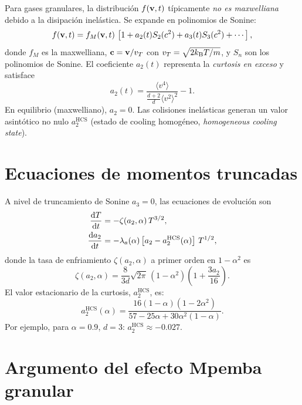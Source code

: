 Para gases granulares, la distribución $f(\vb{v},t)$ típicamente \emph{no es 
maxwelliana} debido a la disipación inelástica. Se expande en polinomios de 
Sonine:
\begin{equation}
    f(\vb{v},t) = f_{M}(\vb{v},t) \, \left[1 + a_{2}(t) S_{2}(c^{2}) + a_{3}(t) S_{3}(c^{2}) + \cdots\right],
\end{equation}
%
donde $f_{M}$ es la maxwelliana, $\vb{c} = \vb{v}/v_{T}$ con $v_{T} = \sqrt{2 k_{\mathrm{B}} T/m}$, 
y $S_{n}$ son los polinomios de Sonine. El coeficiente $a_{2}(t)$ representa la 
\emph{curtosis en exceso} y satisface
\begin{equation}
    a_{2}(t) = \frac{\langle v^{4} \rangle}{\frac{d+2}{d}\langle v^{2} \rangle^{2}} - 1.
    \label{eq:a2_kurtosis}
\end{equation}
%
\noindent En equilibrio (maxwelliano), $a_2 = 0$. Las colisiones inelásticas 
generan un valor asintótico no nulo $a_2^{\mathrm{HCS}}$ (estado de cooling 
homogéneo, \emph{homogeneous cooling state}).

\section{Ecuaciones de momentos truncadas}

A nivel de truncamiento de Sonine $a_3 = 0$, las ecuaciones de evolución son
\begin{equation}
\begin{aligned}
    \dv{T}{t} &= -\zeta(a_2, \alpha) \, T^{3/2}, \\
    \dv{a_2}{t} &= -\lambda_{a}(\alpha) \left[a_2 - a_2^{\mathrm{HCS}}(\alpha)\right] \, T^{1/2},
\end{aligned}
\label{eq:granular_moments}
\end{equation}
%
donde la tasa de enfriamiento $\zeta(a_2, \alpha)$ a primer orden en $1 - \alpha^2$ es
\begin{equation}
    \zeta(a_2, \alpha) = \frac{8}{3d} \sqrt{2\pi} \, (1 - \alpha^2) \left(1 + \frac{3 a_2}{16}\right).
    \label{eq:zeta}
\end{equation}
%
El valor estacionario de la curtosis, $a_2^{\mathrm{HCS}}$, es:
\begin{equation}
    a_2^{\mathrm{HCS}}(\alpha) = \frac{16 (1-\alpha)(1-2\alpha^2)}
    {57 - 25\alpha + 30 \alpha^2 (1-\alpha)}.
    \label{eq:a2_HCS}
\end{equation}
%
\noindent Por ejemplo, para $\alpha = 0.9$, $d = 3$: $a_2^{\mathrm{HCS}} \approx -0.027$.

\section{Argumento del efecto Mpemba granular}

